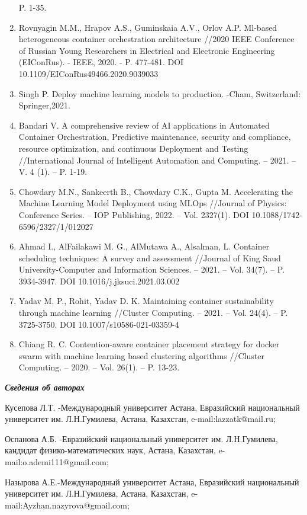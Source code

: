 \begin{enumerate}
  P. 1-35.
\item
  Rovnyagin M.M., Hrapov A.S., Guminskaia A.V., Orlov A.P. Ml-based
  heterogeneous container orchestration architecture //2020 IEEE
  Conference of Russian Young Researchers in Electrical and Electronic
  Engineering (EIConRus). - IEEE, 2020. - P. 477-481. DOI
  10.1109/EIConRus49466.2020.9039033
\item
  Singh P. Deploy machine learning models to production. -Cham,
  Switzerland: Springer,2021.
\item
  Bandari V. A comprehensive review of AI applications in Automated
  Container Orchestration, Predictive maintenance, security and
  compliance, resource optimization, and continuous Deployment and
  Testing //International Journal of Intelligent Automation and
  Computing. -- 2021. -- V. 4 (1). -- P. 1-19.
\item
  Chowdary M.N., Sankeerth B., Chowdary C.K., Gupta M. Accelerating the
  Machine Learning Model Deployment using MLOps //Journal of Physics:
  Conference Series. -- IOP Publishing, 2022. -- Vol. 2327(1). DOI
  10.1088/1742-6596/2327/1/012027
\item
  Ahmad I., AlFailakawi M. G., AlMutawa A., Alsalman, L. Container
  scheduling techniques: A survey and assessment //Journal of King Saud
  University-Computer and Information Sciences. -- 2021. -- Vol. 34(7).
  -- P. 3934-3947. DOI 10.1016/j.jksuci.2021.03.002
\item
  Yadav M. P., Rohit, Yadav D. K. Maintaining container sustainability
  through machine learning //Cluster Computing. -- 2021. -- Vol. 24(4).
  -- P. 3725-3750. DOI 10.1007/s10586-021-03359-4
\item
  Chiang R. C. Contention-aware container placement strategy for docker
  swarm with machine learning based clustering algorithms //Cluster
  Computing. -- 2020. -- Vol. 26(1). -- P. 13-23.
\end{enumerate}

\emph{{\bfseries Сведения об авторах}}

Кусепова Л.Т. -Международный университет Астана, Евразийский
национальный университет им. Л.Н.Гумилева, Астана, Казахстан,
e-mail:lazzatk@mail.ru;

Оспанова А.Б. -Евразийский национальный университет им. Л.Н.Гумилева,
кандидат физико-математических наук, Астана, Казахстан,
e-mail:o.ademi111@gmail.com;

Назырова А.Е.-Международный университет Астана, Евразийский национальный
университет им. Л.Н.Гумилева, Астана, Казахстан,
e-mail:Ayzhan.nazyrova@gmail.com;

